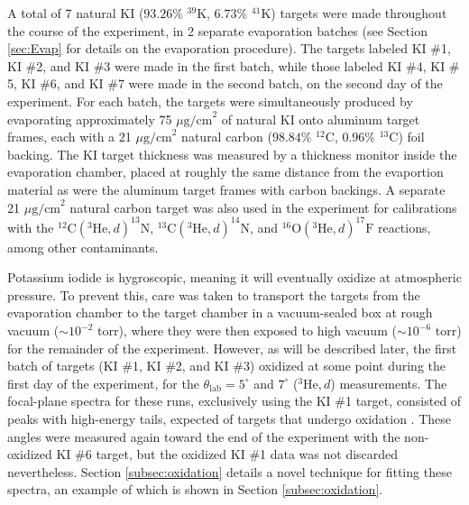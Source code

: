A total of 7 natural KI ($93.26\%$ $^{39}$K, $6.73\%$ $^{41}$K) targets were made throughout the course of the experiment, in 2 separate evaporation batches (see Section \ref{sec:Evap} for details on the evaporation procedure). The targets labeled KI $\#$1, KI $\#$2, and KI $\#$3 were made in the first batch, while those labeled KI $\#$4, KI $\#$5, KI $\#$6, and KI $\#$7 were made in the second batch, on the second day of the experiment. For each batch, the targets were simultaneously produced by evaporating approximately 75 $\mu\mathrm{g/cm}^{2}$ of natural KI onto aluminum target frames, each with a 21 $\mu\mathrm{g/cm}^{2}$ natural carbon ($98.84\%$ $^{12}$C, $0.96\%$ $^{13}$C) foil backing. The KI target thickness was measured by a thickness monitor inside the evaporation chamber, placed at roughly the same distance from the evaportion material as were the aluminum target frames with carbon backings.
A separate 21 $\mu\mathrm{g/cm}^{2}$ natural carbon target was also used in the experiment for calibrations with the $^{12}\mathrm{C}(^{3}\mathrm{He},d)^{13}\mathrm{N}$, $^{13}\mathrm{C}(^{3}\mathrm{He},d)^{14}\mathrm{N}$, and $^{16}\mathrm{O}(^{3}\mathrm{He},d)^{17}\mathrm{F}$ reactions, among other contaminants.


Potassium iodide is hygroscopic, meaning it will eventually oxidize at atmospheric pressure. To prevent this, care was taken to transport the targets from the evaporation chamber to the target chamber in a vacuum-sealed box at rough vacuum ($\sim 10^{-2}$ torr), where they were then exposed to high vacuum ($\sim 10^{-6}$ torr) for the remainder of the experiment. However, as will be described later, the first batch of targets (KI $\#$1, KI $\#$2, and KI $\#$3) oxidized at some point during the first day of the experiment, for the $\theta_{\mathrm{lab}} = 5^{\circ}$ and $7^{\circ}$ ($^{3}\mathrm{He},d$) measurements. The focal-plane spectra for these runs, exclusively using the KI $\#$1 target, consisted of peaks with high-energy tails, expected of targets that undergo oxidation \cite{Landau1944}. These angles were measured again toward the end of the experiment with the non-oxidized KI $\#$6 target, but the oxidized KI $\#$1 data was not discarded nevertheless. Section \ref{subsec:oxidation} details a novel technique for fitting these spectra, an example of which is shown in Section \ref{subsec:oxidation}.

